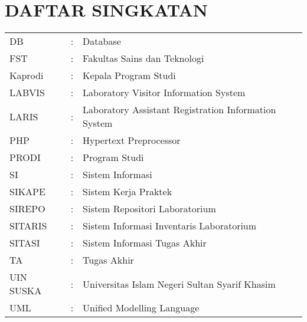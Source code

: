 %
%
%
%

\chapter*{DAFTAR SINGKATAN}
\begin{tabular}{lll}
	DB        & : & Database                                             \\
	FST       & : & Fakultas Sains dan Teknologi                         \\
	Kaprodi   & : & Kepala Program Studi                                 \\
	LABVIS    & : & Laboratory Visitor Information System                \\
	LARIS     & : & Laboratory Assistant Registration Information System \\
	PHP       & : & Hypertext Preprocessor                               \\
	PRODI     & : & Program Studi                                        \\
	SI        & : & Sistem Informasi                                     \\
	SIKAPE    & : & Sistem Kerja Praktek                                 \\
	SIREPO    & : & Sistem Repositori Laboratorium                       \\
	SITARIS   & : & Sistem Informasi Inventaris Laboratorium             \\
	SITASI    & : & Sistem Informasi Tugas Akhir                         \\
	TA        & : & Tugas Akhir                                          \\
	UIN SUSKA & : & Universitas Islam Negeri Sultan Syarif Khasim        \\
	UML       & : & Unified Modelling Language                           \\
\end{tabular}